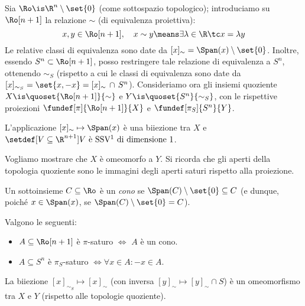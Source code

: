 


Sia $\Ro \is \R^n \setminus \set{0}$ (come sottospazio topologico);
introduciamo su $\Ro[n+1]$ la relazione $\sim $ (di equivalenza proiettiva):
\[x, y \in \Ro[n+1],\quad x \sim y \means  \exists \lambda  \in  \R \tc x = \lambda y \]
Le relative classi di equivalenza sono date da $[x]_\sim = \Span(x) \setminus \set{0}$.
Inoltre, essendo $S^n \subset \Ro[n+1]$,
posso restringere tale relazione di equivalenza a $S^n$, ottenendo $\sim_S$
(rispetto a cui le classi di equivalenza sono date da
$[x]_{\sim_S} = \set{x, -x} = [x]_\sim \, \cap \, S^n$).
Consideriamo ora gli insiemi quoziente $X \is \quoset{\Ro[n+1]}{\sim}$ e $Y \is \quoset{S^n}{\sim_S}$,
con le rispettive proiezioni $\fundef[\pi]{\Ro[n+1]}{X}$ e $\fundef[\pi_S]{S^n}{Y}$.

\begin{oss}
	L'applicazione $[x]_\sim  \mapsto  \Span(x)$ è una biiezione tra $X$ e \break
	$\setdef[V \subseteq \R^{n+1}]{V \text{ è SSV\footnotemark{} di dimensione 1}}$.
\end{oss}

Vogliamo mostrare che $X$ è omeomorfo a $Y$.
Si ricorda che gli aperti della topologia quoziente sono le immagini degli aperti saturi rispetto alla proiezione.

\begin{defn}[Cono]
	Un sottoinsieme $C\subseteq\Ro$ è un \emph{cono} se $\Span(C)\setminus\set{0}\subseteq C$
	(e dunque, poiché $x\in\Span(x)$, se $\Span(C)\setminus\set{0}=C$).
\end{defn}

\begin{ex}
	\label{th:pnsaturo}
	Valgono le seguenti:
	\begin{itemize}
		\item $A \subseteq \Ro[n+1]$ è $\pi$-saturo $\iff$ $A$ è un cono.
		\item $A \subseteq S^n$ è $\pi_S$-saturo $\iff \forall x \in A:-x \in A$.
	\end{itemize}
\end{ex}

\begin{prop}
	La biiezione $[x]_{\sim_S}  \mapsto  [x]_\sim$
	(con inversa $[y]_\sim  \mapsto  [y]_\sim \cap S$)
	è un omeomorfismo tra $X$ e $Y$ (rispetto alle topologie quoziente).
\end{prop}


